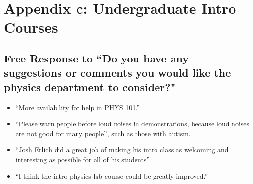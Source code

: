 \documentclass[oneside]{book}   %
\begin{document}
\section{Appendix c: Undergraduate Intro Courses}
\label{sec:free_response_intro}

\subsection{Free Response to ``Do you have any suggestions or comments you would like the physics department to consider?"}
\begin{itemize}
	\item “More availability for help in PHYS 101.”
	\item “Please warn people before loud noises in demonstrations, because loud noises are not good for many people”, such as those with autism.
	\item “Josh Erlich did a great job of making his intro class as welcoming and interesting as possible for all of his students”
	\item “I think the intro physics lab course could be greatly improved.”
\end{itemize}
\end{document}
